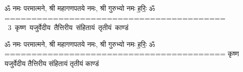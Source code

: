 \documentclass[17pt]{extarticle}
\begin{document}
\begin{titlepage}
    \begin{center}
 
\begin{sanskrit}
    { \Large
    ॐ नमः परमात्मने, श्री महागणपतये नमः, श्री गुरुभ्यो नमः
ह॒रिः॒ ॐ
========================================= 
    }
    \\
    \vspace{2.5cm}
    \mbox{ \Huge
    3       कृष्ण यजुर्वेदीय तैत्तिरीय संहितायं तृतीयं काण्डं   }
\end{sanskrit}
\end{center}

\end{titlepage}
\tableofcontents

ॐ नमः परमात्मने, श्री महागणपतये नमः, श्री गुरुभ्यो नमः
ह॒रिः॒ ॐ
=========================================        कृष्ण यजुर्वेदीय तैत्तिरीय संहितायं तृतीयं काण्डं \newline
\end{document}
